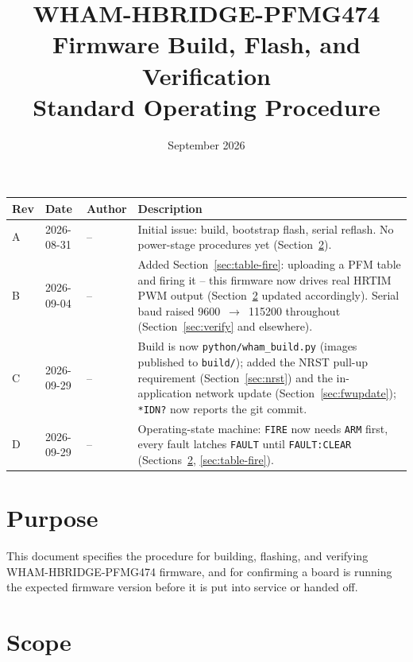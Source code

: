 \documentclass[11pt]{article}
\title{WHAM-HBRIDGE-PFMG474\\ \large Firmware Build, Flash, and Verification \\ Standard Operating Procedure}
\author{}
\date{September 2026}
\newcommand{\code}[1]{\texttt{#1}}
\begin{document}
\maketitle

\begin{center}
\begin{tabular}{p{0.45in} p{0.75in} p{0.5in} p{2.7in}}
  \hline
  \textbf{Rev} & \textbf{Date} & \textbf{Author} & \textbf{Description} \\
  \hline
  A & 2026-08-31 & -- & Initial issue: build, bootstrap flash, serial
    reflash. No power-stage procedures yet (Section~\ref{sec:scope}). \\
  B & 2026-09-04 & -- & Added Section~\ref{sec:table-fire}: uploading a
    PFM table and firing it -- this firmware now drives real HRTIM PWM
    output (Section~\ref{sec:scope} updated accordingly). Serial baud
    raised 9600~$\to$~115200 throughout (Section~\ref{sec:verify} and
    elsewhere). \\
  C & 2026-09-29 & -- & Build is now \code{python/wham\_build.py}
    (images published to \code{build/}); added the NRST pull-up requirement
    (Section~\ref{sec:nrst}) and the in-application network update
    (Section~\ref{sec:fwupdate}); \code{*IDN?} now reports the git
    commit. \\
  D & 2026-09-29 & -- & Operating-state machine: \code{FIRE} now needs
    \code{ARM} first, every fault latches \code{FAULT} until
    \code{FAULT:CLEAR} (Sections~\ref{sec:scope}, \ref{sec:table-fire}). \\
  \hline
\end{tabular}
\end{center}

\section{Purpose}

This document specifies the procedure for building, flashing, and
verifying WHAM-HBRIDGE-PFMG474 firmware, and for confirming a board is
running the expected firmware version before it is put into service or
handed off.

\section{Scope}
\label{sec:scope}
\end{document}
